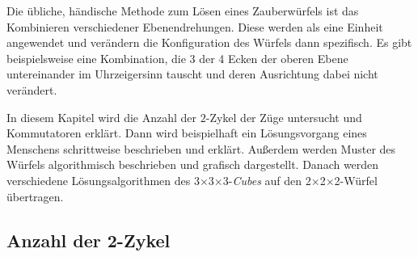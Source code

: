 \documentclass[12pt,a4paper, usenames, dvipsnames]{article}
\theoremstyle{mystyle}
\theoremstyle{definition}
\newcommand{\Ttwo}{2$\times$2$\times$2-}
\newcommand{\Tthree}{3$\times$3$\times$3-}
\begin{document}
Die übliche, händische Methode zum Lösen eines Zauberwürfels ist das Kombinieren verschiedener Ebenendrehungen. Diese werden als eine Einheit angewendet und verändern die Konfiguration des Würfels dann spezifisch. 
Es gibt beispielsweise eine Kombination, die 3 der 4 Ecken der oberen Ebene untereinander im Uhrzeigersinn tauscht und deren Ausrichtung dabei nicht verändert. 

In diesem Kapitel wird die Anzahl der $2$-Zykel der Züge untersucht und Kommutatoren erklärt.
Dann wird beispielhaft ein Lösungsvorgang eines Menschens schrittweise beschrieben und erklärt.
Außerdem werden Muster des Würfels algorithmisch beschrieben und grafisch dargestellt.
Danach werden verschiedene Lösungsalgorithmen des \Tthree \textit{Cubes} auf den \Ttwo Würfel übertragen.

%
%
%
%
%
%
%
%
%
%
%
%
%
%
%
%
%
%
%
%
\subsection{Anzahl der 2-Zykel}
\end{document}
